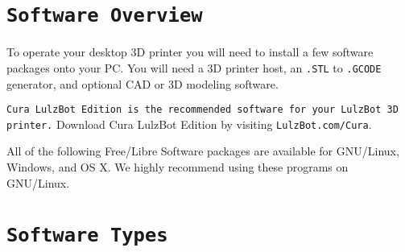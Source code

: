 %
%
%
%
%

\section{\texttt{Software Overview}}

To operate your desktop 3D printer you will need to install a few software packages onto your PC. You will need a 3D printer host, an \texttt{.STL} to \texttt{.GCODE} generator, and optional CAD or 3D modeling software.

\texttt{Cura LulzBot\textsuperscript{\miniscule{\textregistered}} Edition is the recommended software for your LulzBot 3D printer.} Download Cura LulzBot Edition by visiting \texttt{LulzBot.com/Cura}.



All of the following Free/Libre Software packages are available for GNU/Linux, Windows, and OS X. We highly recommend using these programs on GNU/Linux.

\section{\texttt{Software Types}}

